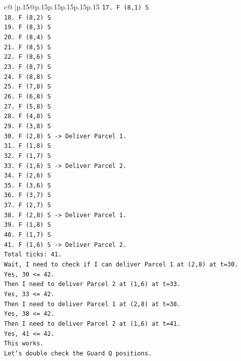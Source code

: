 \documentclass{article}
\begin{document}
{\begin{supertabular}{c@{$\;$}|p{.15\linewidth}@{}p{.15\linewidth}p{.15\linewidth}p{.15\linewidth}p{.15\linewidth}p{.15\linewidth}}
{{{\texttt{17. F (8,1) S} \\
\texttt{18. F (8,2) S} \\
\texttt{19. F (8,3) S} \\
\texttt{20. F (8,4) S} \\
\texttt{21. F (8,5) S} \\
\texttt{22. F (8,6) S} \\
\texttt{23. F (8,7) S} \\
\texttt{24. F (8,8) S} \\
\texttt{25. F (7,8) S} \\
\texttt{26. F (6,8) S} \\
\texttt{27. F (5,8) S} \\
\texttt{28. F (4,8) S} \\
\texttt{29. F (3,8) S} \\
\texttt{30. F (2,8) S {-}> Deliver Parcel 1.} \\
\texttt{31. F (1,8) S} \\
\texttt{32. F (1,7) S} \\
\texttt{33. F (1,6) S {-}> Deliver Parcel 2.} \\
\texttt{34. F (2,6) S} \\
\texttt{35. F (3,6) S} \\
\texttt{36. F (3,7) S} \\
\texttt{37. F (2,7) S} \\
\texttt{38. F (2,8) S {-}> Deliver Parcel 1.} \\
\texttt{39. F (1,8) S} \\
\texttt{40. F (1,7) S} \\
\texttt{41. F (1,6) S {-}> Deliver Parcel 2.} \\
\texttt{Total ticks: 41.} \\
\texttt{Wait, I need to check if I can deliver Parcel 1 at (2,8) at t=30.} \\
\texttt{Yes, 30 <= 42.} \\
\texttt{Then I need to deliver Parcel 2 at (1,6) at t=33.} \\
\texttt{Yes, 33 <= 42.} \\
\texttt{Then I need to deliver Parcel 1 at (2,8) at t=38.} \\
\texttt{Yes, 38 <= 42.} \\
\texttt{Then I need to deliver Parcel 2 at (1,6) at t=41.} \\
\texttt{Yes, 41 <= 42.} \\
\texttt{This works.} \\
\texttt{Let's double check the Guard Q positions.} \\
}}}
\end{supertabular}}
\end{document}
